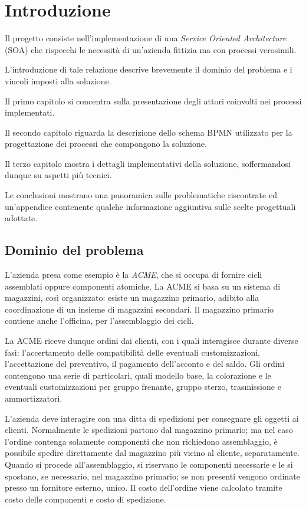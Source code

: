 \section*{Introduzione}
Il progetto consiste nell'implementazione di una \textit{Service
Oriented Architecture} (SOA) che rispecchi le necessit\`a di un'azienda
fittizia ma con processi verosimili.

L'introduzione di tale relazione descrive brevemente il dominio del
problema e i vincoli imposti alla soluzione.

Il primo capitolo si concentra sulla presentazione degli attori
coinvolti nei processi implementati.

Il secondo capitolo riguarda la descrizione dello schema BPMN utilizzato
per la progettazione dei processi che compongono la soluzione.

Il terzo capitolo mostra i dettagli implementativi della soluzione,
soffermandosi dunque su aspetti pi\`u tecnici.

Le conclusioni mostrano una panoramica sulle problematiche riscontrate
ed un'appendice contenente qualche informazione aggiuntiva sulle scelte
progettuali adottate.

\subsection*{Dominio del problema}
L'azienda presa come esempio \`e la \textit{ACME}, che si occupa di
fornire cicli assemblati oppure componenti atomiche.
La ACME si basa su un sistema di magazzini, cos\`i organizzato: esiste
un magazzino primario, adibito alla coordinazione di un insieme di
magazzini secondari. Il magazzino primario contiene anche l'officina,
per l'assemblaggio dei cicli.

La ACME riceve dunque ordini dai clienti, con i quali interagisce
durante diverse fasi: l'accertamento delle compatibilit\`a delle
eventuali customizzazioni, l'accettazione del preventivo, il pagamento
dell'acconto e del saldo. Gli ordini contengono una serie di
particolari, quali modello base, la colorazione e le eventuali
customizzazioni per gruppo frenante, gruppo sterzo, trasmissione e
ammortizzatori.

L'azienda deve interagire con una ditta di spedizioni per consegnare gli
oggetti ai clienti.
Normalmente le spedizioni partono dal magazzino primario; ma nel caso
l'ordine contenga solamente componenti che non richiedono assemblaggio,
\`e possibile spedire direttamente dal magazzino pi\`u vicino al
cliente, separatamente.
Quando si procede all'assemblaggio, si riservano le componenti
necessarie e le si spostano, se necessario, nel magazzino primario;
se non presenti vengono ordinate presso un fornitore esterno, unico.
Il costo dell'ordine viene calcolato tramite costo delle componenti e
costo di spedizione.

